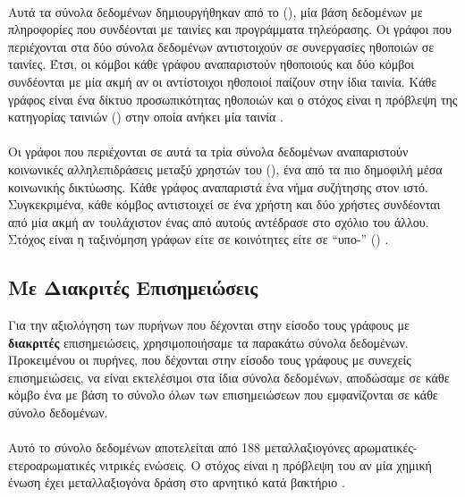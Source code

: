 \paragraph*{}
Αυτά τα σύνολα δεδομένων δημιουργήθηκαν από το  (), μία  βάση δεδομένων με πληροφορίες που συνδέονται με ταινίες και προγράμματα τηλεόρασης.
Οι γράφοι που περιέχονται στα δύο σύνολα δεδομένων αντιστοιχούν σε συνεργασίες ηθοποιών σε ταινίες.
Έτσι, οι κόμβοι κάθε γράφου αναπαριστούν ηθοποιούς και δύο κόμβοι συνδέονται με μία ακμή αν οι αντίστοιχοι ηθοποιοί παίζουν στην ίδια ταινία.
Κάθε γράφος είναι ένα  δίκτυο προσωπικότητας ηθοποιών και ο στόχος είναι η πρόβλεψη της κατηγορίας ταινιών () στην οποία ανήκει μία ταινία \cite{DGK_PINAR}.

\paragraph*{}
Οι γράφοι που περιέχονται σε αυτά τα τρία σύνολα δεδομένων αναπαριστούν κοινωνικές αλληλεπιδράσεις μεταξύ χρηστών του  (), ένα από τα πιο δημοφιλή μέσα κοινωνικής δικτύωσης.
Κάθε γράφος αναπαριστά ένα νήμα συζήτησης στον ιστό.
Συγκεκριμένα, κάθε κόμβος αντιστοιχεί σε ένα χρήστη και δύο χρήστες συνδέονται από μία ακμή αν τουλάχιστον ένας από αυτούς αντέδρασε στο σχόλιο του άλλου.
Στόχος είναι η ταξινόμηση γράφων είτε σε κοινότητες είτε σε ``υπο-'' () \cite{DGK_PINAR}.

\subsection{Με Διακριτές Επισημειώσεις}
\label{ssec:lab}
Για την αξιολόγηση των πυρήνων που δέχονται στην είσοδο τους γράφους με \textbf{διακριτές} επισημειώσεις, χρησιμοποιήσαμε τα παρακάτω σύνολα δεδομένων.
Προκειμένου οι πυρήνες, που δέχονται στην είσοδο τους γράφους με συνεχείς επισημειώσεις, να είναι εκτελέσιμοι στα ίδια σύνολα δεδομένων, αποδώσαμε σε κάθε κόμβο ένα  με βάση το σύνολο όλων των επισημειώσεων που εμφανίζονται σε κάθε σύνολο δεδομένων.

\paragraph*{} Αυτό το σύνολο δεδομένων αποτελείται από 188 μεταλλαξιογόνες αρωματικές-ετεροαρωματικές νιτρικές ενώσεις.
Ο στόχος είναι η πρόβλεψη του αν μία χημική ένωση έχει μεταλλαξιογόνα δράση στο αρνητικό κατά  βακτήριο  \cite{shervashidze2011weisfeiler}.

